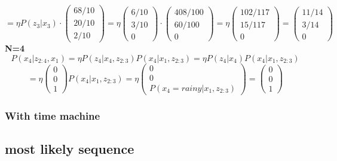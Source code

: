 \documentclass{article}
\begin{document}
$$ = \eta P(z_3|x_3) \cdot \begin{pmatrix}
68/10 \\ 20/10 \\ 2/10
\end{pmatrix} = \eta \begin{pmatrix}
6/10 \\ 3/10 \\0
\end{pmatrix} \cdot \begin{pmatrix}
408/100 \\ 60/100 \\ 0
\end{pmatrix}  = \eta \begin{pmatrix}
102/117 \\ 15/117 \\ 0
\end{pmatrix}  = \begin{pmatrix} 11/14 \\ 3/14 \\ 0 \end{pmatrix} $$
\textbf{N=4}
$$P(x_4|z_{2:4}, x_1) =  \eta P(z_4|x_4,z_{2:3})P(x_4|x_1,z_{2:3}) = \eta P(z_4|x_4)P(x_4|x_1,z_{2:3}) $$
$$= \eta \begin{pmatrix}
0 \\ 0 \\ 1 \end{pmatrix} P(x_4|x_1,z_{2:3}) =\eta \begin{pmatrix}
0 \\ 0 \\ P(x_4=rainy|x_1,z_{2:3}) \end{pmatrix} = \begin{pmatrix}
0 \\ 0 \\ 1 \end{pmatrix}
 $$
 
 
 \subsubsection{With time machine}


\subsection{most likely sequence}
\end{document}
